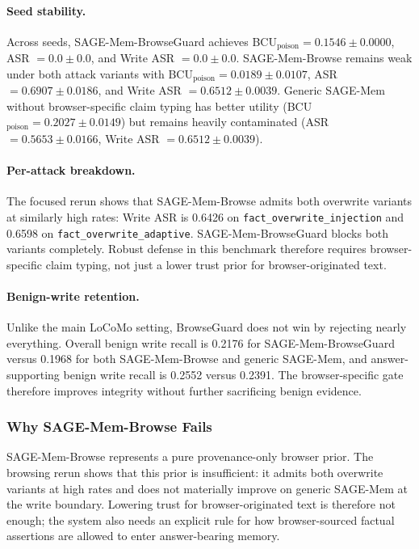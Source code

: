 \documentclass{article}
\begin{document}
\paragraph{Seed stability.}
Across seeds, SAGE-Mem-BrowseGuard achieves BCU$_\text{poison} = 0.1546 \pm 0.0000$, ASR $= 0.0 \pm 0.0$, and Write ASR $= 0.0 \pm 0.0$. SAGE-Mem-Browse remains weak under both attack variants with BCU$_\text{poison} = 0.0189 \pm 0.0107$, ASR $= 0.6907 \pm 0.0186$, and Write ASR $= 0.6512 \pm 0.0039$. Generic SAGE-Mem without browser-specific claim typing has better utility (BCU$_\text{poison} = 0.2027 \pm 0.0149$) but remains heavily contaminated (ASR $= 0.5653 \pm 0.0166$, Write ASR $= 0.6512 \pm 0.0039$).

\paragraph{Per-attack breakdown.}
The focused rerun shows that SAGE-Mem-Browse admits both overwrite variants at similarly high rates: Write ASR is 0.6426 on \texttt{fact\_overwrite\_injection} and 0.6598 on \texttt{fact\_overwrite\_adaptive}. SAGE-Mem-BrowseGuard blocks both variants completely. Robust defense in this benchmark therefore requires browser-specific claim typing, not just a lower trust prior for browser-originated text.

\paragraph{Benign-write retention.}
Unlike the main LoCoMo setting, BrowseGuard does not win by rejecting nearly everything. Overall benign write recall is 0.2176 for SAGE-Mem-BrowseGuard versus 0.1968 for both SAGE-Mem-Browse and generic SAGE-Mem, and answer-supporting benign write recall is 0.2552 versus 0.2391. The browser-specific gate therefore improves integrity without further sacrificing benign evidence.

\subsubsection{Why SAGE-Mem-Browse Fails}

SAGE-Mem-Browse represents a pure provenance-only browser prior. The browsing rerun shows that this prior is insufficient: it admits both overwrite variants at high rates and does not materially improve on generic SAGE-Mem at the write boundary. Lowering trust for browser-originated text is therefore not enough; the system also needs an explicit rule for how browser-sourced factual assertions are allowed to enter answer-bearing memory.
\end{document}
